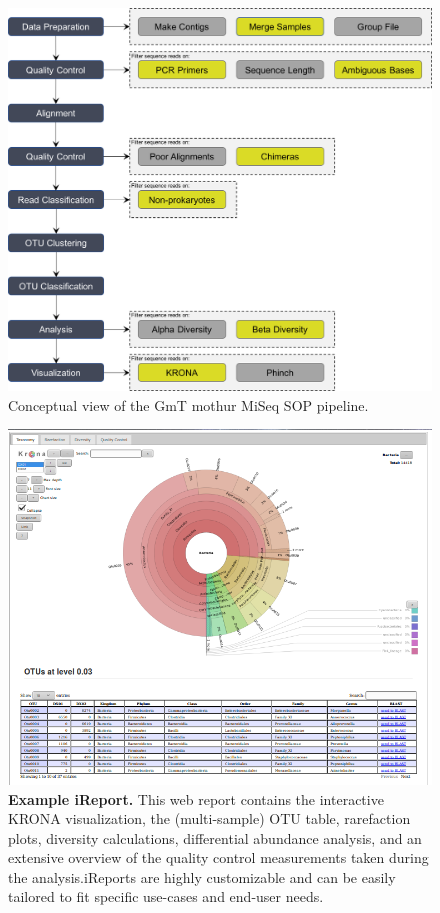 \begin{figure}[t!]
\centering
\includegraphics[scale=0.5]{chapters/images/gmt/Figure1.png}
\caption{Conceptual view of the GmT mothur MiSeq SOP pipeline.}\label{end-to-end}
\end{figure}

\begin{figure}[t!]
\centering
\includegraphics[scale=0.5]{chapters/images/gmt/ireport.png}
\caption{\textbf{Example iReport.} This web report contains the interactive KRONA visualization, the (multi-sample) OTU table, rarefaction plots, diversity calculations, differential abundance analysis, and an extensive overview of the quality control measurements taken during the analysis.\@ iReports are highly customizable and can be easily tailored to fit specific use-cases and end-user needs.}\label{ireport}
\end{figure}


